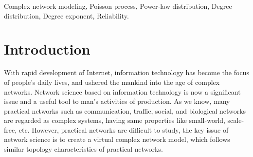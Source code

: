 \documentclass[final]{IEEEtran}
\begin{document}
\begin{keywords}
Complex network modeling, Poisson process, Power-law distribution,
Degree distribution, Degree exponent, Reliability.
\end{keywords}
\maketitle\thispagestyle{plain}\pagestyle{plain}



\thispagestyle{fancy}
\renewcommand{\headrulewidth}{0cm}

\section{Introduction}
With rapid development of Internet, information technology has
become the focus of people's daily lives, and ushered the mankind
into the age of complex networks. Network science based on
information technology is now a significant issue and a useful
tool to man's activities of production. As we know, many practical
networks such as communication, traffic, social, and biological
networks are regarded as complex systems, having same properties
like small-world, scale-free, etc. However, practical networks are
difficult to study, the key issue of network science is to create
a virtual complex network model, which follows similar topology
characteristics of practical networks.
\end{document}

